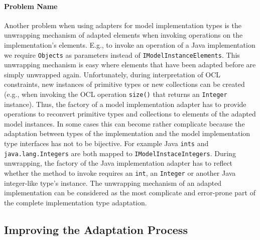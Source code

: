 	\paragraph{Problem Name}
	Another problem when using adapters for model implementation types 
	is the unwrapping mechanism of adapted elements when invoking operations 
	on the implementation's elements. E.g., to invoke an operation of a Java 
	implementation we require \texttt{Objects} as parameters instead of 
	\texttt{IModelInstanceElements}. This unwrapping mechanism is easy 
	where elements that have been adapted before are simply unwrapped 
	again. Unfortunately, during interpretation of OCL constraints, 
	new instances of primitive types or new collections can be created 
	(e.g., when invoking the OCL operation \texttt{size()} that 
	returns an \texttt{Integer} instance). Thus, the factory of a 
	model implementation adapter has to provide operations to reconvert 
	primitive types and collections to elements of the adapted model 
	instances. In some cases this can become rather complicate because 
	the adaptation between types of the implementation and the model 
	implementation type interfaces has not to be bijective. For 
	example Java \texttt{ints} and \texttt{java.lang.Integers} are 
	both mapped to \texttt{IModelInstaceIntegers}. During unwrapping, 
	the factory of the Java implementation adapter has to reflect 
	whether the method to invoke requires an \texttt{int}, an 
	\texttt{Integer} or another Java integer-like type's instance.
	 The unwrapping mechanism of an adapted implementation 
	 can be considered as the most complicate and error-prone part 
	 of the complete implementation type adaptation. 


	\subsection{Improving the Adaptation Process}
	

